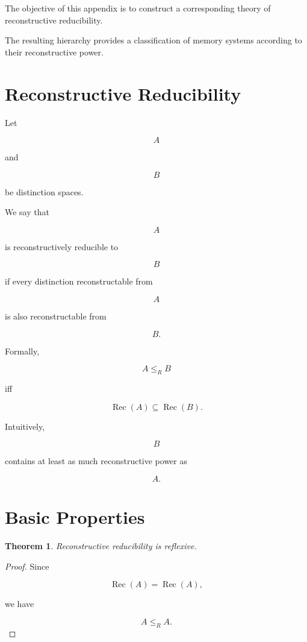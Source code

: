 \documentclass[12pt,oneside]{book}
\theoremstyle{plain} \newtheorem{theorem}{Theorem}[chapter] \newtheorem{lemma}[theorem]{Lemma} \newtheorem{proposition}[theorem]{Proposition} \newtheorem{corollary}[theorem]{Corollary}
\theoremstyle{definition} \newtheorem{definition}[theorem]{Definition} \newtheorem{axiom}[theorem]{Axiom} \newtheorem{construction}[theorem]{Construction}
\theoremstyle{remark} \newtheorem{remark}[theorem]{Remark} \newtheorem{example}[theorem]{Example}
\begin{document}
The objective of this appendix is to construct a corresponding theory of reconstructive reducibility.

The resulting hierarchy provides a classification of memory systems according to their reconstructive power.

\section{Reconstructive Reducibility}

Let

\[
A
\]

and

\[
B
\]

be distinction spaces.

We say that

\[
A
\]

is reconstructively reducible to

\[
B
\]

if every distinction reconstructable from

\[
A
\]

is also reconstructable from

\[
B.
\]

Formally,

\[
A
\le_R
B
\]

iff

\[
\operatorname{Rec}(A)
\subseteq
\operatorname{Rec}(B).
\]

Intuitively,

\[
B
\]

contains at least as much reconstructive power as

\[
A.
\]

\section{Basic Properties}

\begin{theorem}

Reconstructive reducibility is reflexive.

\end{theorem}

\begin{proof}

Since

\[
\operatorname{Rec}(A)
=
\operatorname{Rec}(A),
\]

we have

\[
A
\le_R
A.
\]

\end{proof}
\end{document}

